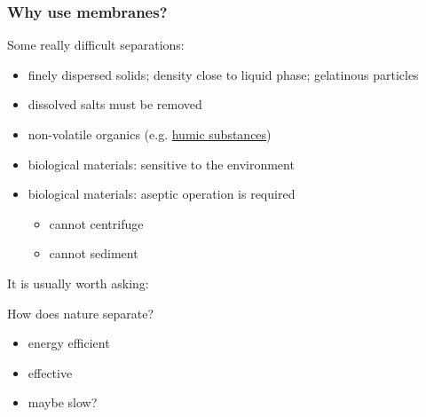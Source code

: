 \begin{frame}\frametitle{Why use membranes?}
	Some really difficult separations:
	\begin{itemize}
		\item	finely dispersed solids; density close to liquid phase; gelatinous particles
		\item	dissolved salts must be removed
		\item	non-volatile organics (e.g. \href{http://en.wikipedia.org/wiki/Humic_acid}{humic substances})
		\item	biological materials: sensitive to the environment
		\item	biological materials: aseptic operation is required
			\begin{itemize}
				\item	cannot centrifuge
				\item	cannot sediment
			\end{itemize}
	\end{itemize}

	\vspace{12pt}
	\begin{exampleblock}{It is usually worth asking:}
		\begin{center}
			How does nature separate?
		\end{center}
		\scriptsize
		\begin{itemize}
			\item	energy efficient
			\item	effective
			\item	maybe slow?
		\end{itemize}
	\end{exampleblock}
\end{frame}

